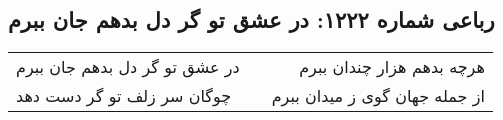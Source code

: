 \begin{center}
\section*{رباعی شماره ۱۲۲۲: در عشق تو گر دل بدهم جان ببرم}
\label{sec:1222}
\begin{longtable}{l p{0.5cm} r}
در عشق تو گر دل بدهم جان ببرم
&&
هرچه بدهم هزار چندان ببرم
\\
چوگان سر زلف تو گر دست دهد
&&
از جمله جهان گوی ز میدان ببرم
\\
\end{longtable}
\end{center}

